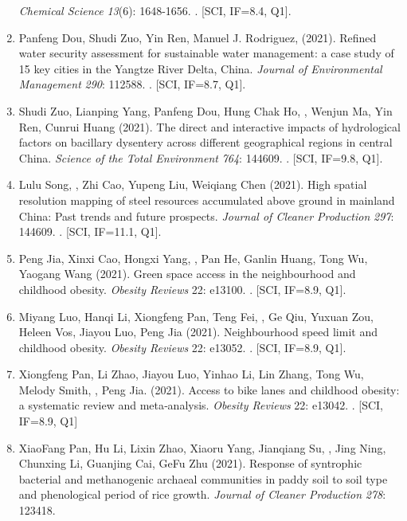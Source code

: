 \begin{enumerate}
    \textit{Chemical Science} \textit{13}(6): 1648-1656.
    . [SCI, IF=8.4, Q1].
\item
    Panfeng Dou, Shudi Zuo, Yin Ren, Manuel J. Rodriguez, \Shaoqing \enspace (2021).
    Refined water security assessment for sustainable water management: a case study of 15 key cities in the Yangtze River Delta, China.
    \textit{Journal of Environmental Management} \textit{290}: 112588.
    . [SCI, IF=8.7, Q1].
\item
    Shudi Zuo, Lianping Yang, Panfeng Dou, Hung Chak Ho, \Shaoqing, Wenjun Ma, Yin Ren, Cunrui Huang (2021).
    The direct and interactive impacts of hydrological factors on bacillary dysentery across different geographical regions in central China.
    \textit{Science of the Total Environment} \textit{764}: 144609.
    . [SCI, IF=9.8, Q1].
\item
    Lulu Song, \Shaoqing, Zhi Cao, Yupeng Liu, Weiqiang Chen (2021).
    High spatial resolution mapping of steel resources accumulated above ground in mainland China: Past trends and future prospects.
    \textit{Journal of Cleaner Production} \textit{297}: 144609.
    . [SCI, IF=11.1, Q1].
\item
    Peng Jia, Xinxi Cao, Hongxi Yang, \Shaoqing, Pan He, Ganlin Huang, Tong Wu, Yaogang Wang (2021).
    Green space access in the neighbourhood and childhood obesity.
    \textit{Obesity Reviews} 22: e13100.
    . [SCI, IF=8.9, Q1].
\item
    Miyang Luo, Hanqi Li, Xiongfeng Pan, Teng Fei, \Shaoqing, Ge Qiu, Yuxuan Zou, Heleen Vos, Jiayou Luo, Peng Jia (2021).
    Neighbourhood speed limit and childhood obesity.
    \textit{Obesity Reviews} 22: e13052.
    . [SCI, IF=8.9, Q1].
\item
    Xiongfeng Pan, Li Zhao, Jiayou Luo, Yinhao Li, Lin Zhang, Tong Wu, Melody Smith, \Shaoqing, Peng Jia. (2021).
    Access to bike lanes and childhood obesity: a systematic review and meta‐analysis.
    \textit{Obesity Reviews} 22: e13042.
    . [SCI, IF=8.9, Q1]
\item
    XiaoFang Pan, Hu Li, Lixin Zhao, Xiaoru Yang, Jianqiang Su, \Shaoqing, Jing Ning, Chunxing Li, Guanjing Cai, GeFu Zhu (2021).
    Response of syntrophic bacterial and methanogenic archaeal communities in paddy soil to soil type and phenological period of rice growth.
    \textit{Journal of Cleaner Production} \textit{278}: 123418.

\end{enumerate}
